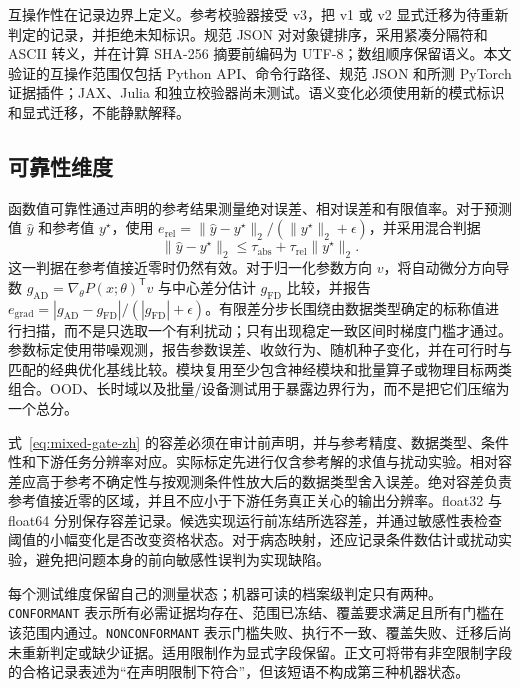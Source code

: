 \documentclass[preprint,12pt,authoryear]{elsarticle}
\begin{document}
互操作性在记录边界上定义。参考校验器接受 v3，把 v1 或 v2 显式迁移为待重新判定的记录，并拒绝未知标识。规范 JSON 对对象键排序，采用紧凑分隔符和 ASCII 转义，并在计算 SHA-256 摘要前编码为 UTF-8；数组顺序保留语义。本文验证的互操作范围仅包括 Python API、命令行路径、规范 JSON 和所测 PyTorch 证据插件；JAX、Julia 和独立校验器尚未测试。语义变化必须使用新的模式标识和显式迁移，不能静默解释。

\subsection{可靠性维度}
函数值可靠性通过声明的参考结果测量绝对误差、相对误差和有限值率。对于预测值 $\hat y$ 和参考值 $y^{\star}$，使用 $e_{\mathrm{rel}}=\|\hat y-y^{\star}\|_2/(\|y^{\star}\|_2+\epsilon)$，并采用混合判据
\begin{equation}
 \|\hat y-y^{\star}\|_2\leq
 \tau_{\mathrm{abs}}+\tau_{\mathrm{rel}}\|y^{\star}\|_2.
 \label{eq:mixed-gate-zh}
\end{equation}
这一判据在参考值接近零时仍然有效。对于归一化参数方向 $v$，将自动微分方向导数 $g_{\mathrm{AD}}=\nabla_{\theta}P(x;\theta)^{\mathsf T}v$ 与中心差分估计 $g_{\mathrm{FD}}$ 比较，并报告 $e_{\mathrm{grad}}=|g_{\mathrm{AD}}-g_{\mathrm{FD}}|/(|g_{\mathrm{FD}}|+\epsilon)$。有限差分步长围绕由数据类型确定的标称值进行扫描，而不是只选取一个有利扰动；只有出现稳定一致区间时梯度门槛才通过。参数标定使用带噪观测，报告参数误差、收敛行为、随机种子变化，并在可行时与匹配的经典优化基线比较。模块复用至少包含神经模块和批量算子或物理目标两类组合。OOD、长时域以及批量/设备测试用于暴露边界行为，而不是把它们压缩为一个总分。

式~\eqref{eq:mixed-gate-zh} 的容差必须在审计前声明，并与参考精度、数据类型、条件性和下游任务分辨率对应。实际标定先进行仅含参考解的求值与扰动实验。相对容差应高于参考不确定性与按观测条件性放大后的数据类型舍入误差。绝对容差负责参考值接近零的区域，并且不应小于下游任务真正关心的输出分辨率。float32 与 float64 分别保存容差记录。候选实现运行前冻结所选容差，并通过敏感性表检查阈值的小幅变化是否改变资格状态。对于病态映射，还应记录条件数估计或扰动实验，避免把问题本身的前向敏感性误判为实现缺陷。

每个测试维度保留自己的测量状态；机器可读的档案级判定只有两种。\texttt{CONFORMANT} 表示所有必需证据均存在、范围已冻结、覆盖要求满足且所有门槛在该范围内通过。\texttt{NONCONFORMANT} 表示门槛失败、执行不一致、覆盖失败、迁移后尚未重新判定或缺少证据。适用限制作为显式字段保留。正文可将带有非空限制字段的合格记录表述为“在声明限制下符合”，但该短语不构成第三种机器状态。
\end{document}
